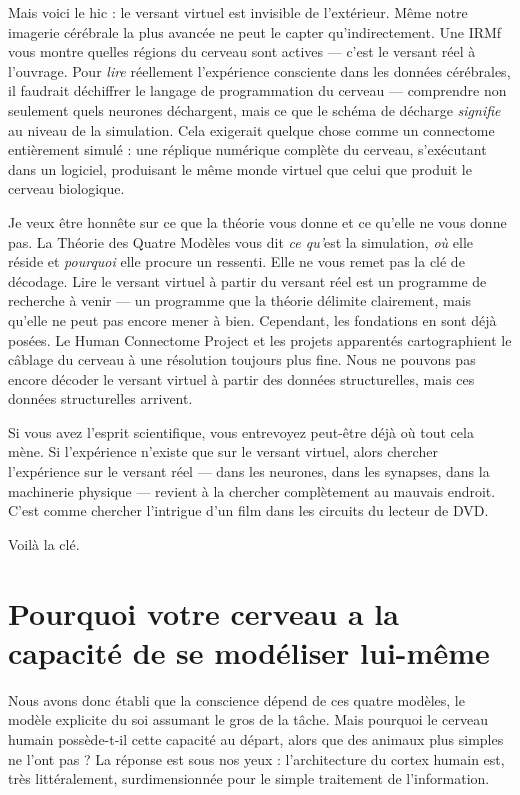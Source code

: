 \documentclass[11pt, twoside, openright]{book}
\begin{document}
Mais voici le hic : le versant virtuel est invisible de l'extérieur. Même notre imagerie cérébrale la plus avancée ne peut le capter qu'indirectement. Une IRMf vous montre quelles régions du cerveau sont actives --- c'est le versant réel à l'ouvrage. Pour \textit{lire} réellement l'expérience consciente dans les données cérébrales, il faudrait déchiffrer le langage de programmation du cerveau --- comprendre non seulement quels neurones déchargent, mais ce que le schéma de décharge \textit{signifie} au niveau de la simulation. Cela exigerait quelque chose comme un connectome entièrement simulé : une réplique numérique complète du cerveau, s'exécutant dans un logiciel, produisant le même monde virtuel que celui que produit le cerveau biologique.

Je veux être honnête sur ce que la théorie vous donne et ce qu'elle ne vous donne pas. La Théorie des Quatre Modèles vous dit \textit{ce qu'}est la simulation, \textit{où} elle réside et \textit{pourquoi} elle procure un ressenti. Elle ne vous remet pas la clé de décodage. Lire le versant virtuel à partir du versant réel est un programme de recherche à venir --- un programme que la théorie délimite clairement, mais qu'elle ne peut pas encore mener à bien. Cependant, les fondations en sont déjà posées. Le Human Connectome Project et les projets apparentés cartographient le câblage du cerveau à une résolution toujours plus fine. Nous ne pouvons pas encore décoder le versant virtuel à partir des données structurelles, mais ces données structurelles arrivent.

Si vous avez l'esprit scientifique, vous entrevoyez peut-être déjà où tout cela mène. Si l'expérience n'existe que sur le versant virtuel, alors chercher l'expérience sur le versant réel --- dans les neurones, dans les synapses, dans la machinerie physique --- revient à la chercher complètement au mauvais endroit. C'est comme chercher l'intrigue d'un film dans les circuits du lecteur de DVD.

Voilà la clé.

\section*{Pourquoi votre cerveau a la capacité de se modéliser lui-même}

Nous avons donc établi que la conscience dépend de ces quatre modèles, le modèle explicite du soi assumant le gros de la tâche. Mais pourquoi le cerveau humain possède-t-il cette capacité au départ, alors que des animaux plus simples ne l'ont pas ? La réponse est sous nos yeux : l'architecture du cortex humain est, très littéralement, surdimensionnée pour le simple traitement de l'information.
\end{document}
